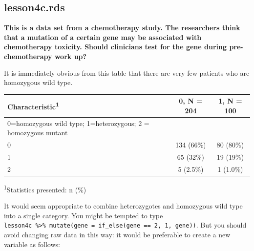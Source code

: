 \documentclass[]{book}
\newenvironment{Shaded}{\begin{snugshade}}{\end{snugshade}}
\newcommand{\DataTypeTok}[1]{\textcolor[rgb]{0.13,0.29,0.53}{#1}}
\newcommand{\DecValTok}[1]{\textcolor[rgb]{0.00,0.00,0.81}{#1}}
\newcommand{\KeywordTok}[1]{\textcolor[rgb]{0.13,0.29,0.53}{\textbf{#1}}}
\newcommand{\NormalTok}[1]{#1}
\newcommand{\OperatorTok}[1]{\textcolor[rgb]{0.81,0.36,0.00}{\textbf{#1}}}
\newcommand{\StringTok}[1]{\textcolor[rgb]{0.31,0.60,0.02}{#1}}
\begin{document}
\hypertarget{lesson4c.rds}{%
\subsection{lesson4c.rds}\label{lesson4c.rds}}

\textbf{This is a data set from a chemotherapy study. The researchers
think that a mutation of a certain gene may be associated with
chemotherapy toxicity. Should clinicians test for the gene during
pre-chemotherapy work up?}

It is immediately obvious from this table that there are very few
patients who are homozygous wild type.

\begin{Shaded}
\end{Shaded}

\captionsetup[table]{labelformat=empty,skip=1pt}
\begin{longtable}{lcc}
\toprule
\textbf{Characteristic}\textsuperscript{1} & \textbf{0}, N = 204 & \textbf{1}, N = 100 \\ 
\midrule
0=homozygous wild type; 1=heterozygous; 2 = homozygous mutant &  &  \\ 
0 & 134 (66\%) & 80 (80\%) \\ 
1 & 65 (32\%) & 19 (19\%) \\ 
2 & 5 (2.5\%) & 1 (1.0\%) \\ 
\bottomrule
\end{longtable}
\vspace{-5mm}
\begin{minipage}{\linewidth}
\textsuperscript{1}Statistics presented: n (\%) \\ 
\end{minipage}

It would seem appropriate to combine heterozygotes and homozygous wild
type into a single category. You might be tempted to type
\texttt{lesson4c\ \%\textgreater{}\%\ mutate(gene\ =\ if\_else(gene\ ==\ 2,\ 1,\ gene))}.
But you should avoid changing raw data in this way: it would be
preferable to create a new variable as follows:

\begin{Shaded}
\end{Shaded}
\end{document}
